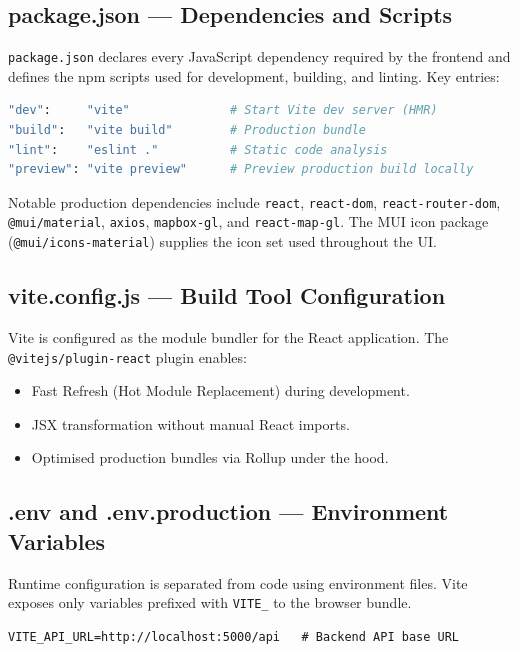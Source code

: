 \documentclass[12pt,a4paper]{report}
\begin{document}
\subsection{package.json --- Dependencies and Scripts}

\texttt{package.json} declares every JavaScript dependency required by the frontend and defines the npm scripts used for development, building, and linting. Key entries:

\begin{lstlisting}[language=bash, caption={Frontend npm scripts}]
"dev":     "vite"              # Start Vite dev server (HMR)
"build":   "vite build"        # Production bundle
"lint":    "eslint ."          # Static code analysis
"preview": "vite preview"      # Preview production build locally
\end{lstlisting}

Notable production dependencies include \texttt{react}, \texttt{react-dom}, \texttt{react-router-dom}, \texttt{@mui/material}, \texttt{axios}, \texttt{mapbox-gl}, and \texttt{react-map-gl}. The MUI icon package (\texttt{@mui/icons-material}) supplies the icon set used throughout the UI.

\subsection{vite.config.js --- Build Tool Configuration}

Vite is configured as the module bundler for the React application. The \texttt{@vitejs/plugin-react} plugin enables:
\begin{itemize}[leftmargin=2em]
  \item Fast Refresh (Hot Module Replacement) during development.
  \item JSX transformation without manual React imports.
  \item Optimised production bundles via Rollup under the hood.
\end{itemize}

\subsection{.env and .env.production --- Environment Variables}

Runtime configuration is separated from code using environment files. Vite exposes only variables prefixed with \texttt{VITE\_} to the browser bundle.

\begin{lstlisting}[caption={Example .env settings}]
VITE_API_URL=http://localhost:5000/api   # Backend API base URL
\end{lstlisting}
\end{document}

